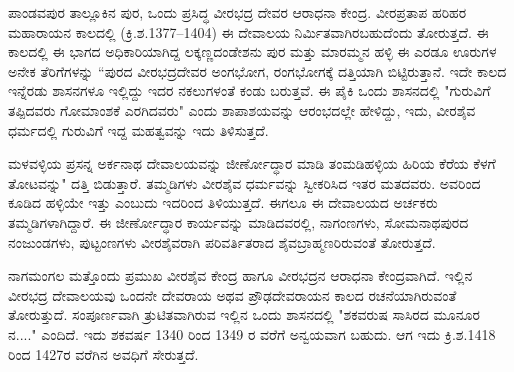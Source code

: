 ಪಾಂಡವಪುರ ತಾಲ್ಲೂಕಿನ ಪುರ, ಒಂದು ಪ್ರಸಿದ್ಧ ವೀರಭದ್ರ ದೇವರ ಆರಾಧನಾ ಕೇಂದ್ರ. ವೀರಪ್ರತಾಪ ಹರಿಹರ ಮಹಾರಾಯನ ಕಾಲದಲ್ಲಿ (ಕ್ರಿ.ಶ.1377–1404) ಈ ದೇವಾಲಯ ನಿರ್ಮಿತವಾಗಿರಬಹುದೆಂದು ತೋರುತ್ತದೆ. ಈ ಕಾಲದಲ್ಲಿ ಈ ಭಾಗದ ಅಧಿಕಾರಿಯಾಗಿದ್ದ ಲಕ್ಕಣ್ಣದಂಡೇಶನು ಪುರ ಮತ್ತು ಮಾರಮ್ಮನ ಹಳ್ಳಿ ಈ ಎರಡೂ ಊರುಗಳ ಅನೇಕ ತೆರಿಗೆಗಳನ್ನು “ಪುರದ ವೀರಭದ್ರದೇವರ ಅಂಗಭೋಗ, ರಂಗಭೋಗಕ್ಕೆ ದತ್ತಿಯಾಗಿ ಬಿಟ್ಟಿರುತ್ತಾನೆ. ಇದೇ ಕಾಲದ ಇನ್ನೆರಡು ಶಾಸನಗಳೂ ಇಲ್ಲಿದ್ದು ಇದರ ನಕಲುಗಳಂತೆ ಕಂಡು ಬರುತ್ತವೆ. ಈ ಪೈಕಿ ಒಂದು ಶಾಸನದಲ್ಲಿ "ಗುರುವಿಗೆ ತಪ್ಪಿದವರು ಗೋಮಾಂಶಕೆ ಎರಗಿದವರು" ಎಂದು ಶಾಪಾಶಯವನ್ನು ಆರಂಭದಲ್ಲೇ ಹೇಳಿದ್ದು, ಇದು, ವೀರಶೈವ ಧರ್ಮದಲ್ಲಿ ಗುರುವಿಗೆ ಇದ್ದ ಮಹತ್ವವನ್ನು ಇದು ತಿಳಿಸುತ್ತದೆ.

ಮಳವಳ್ಳಿಯ ಪ್ರಸನ್ನ ಅರ್ಕನಾಥ ದೇವಾಲಯವನ್ನು ಜೀರ್ಣೋದ್ಧಾರ ಮಾಡಿ ತಂಮಡಿಹಳ್ಳಿಯ ಹಿರಿಯ ಕೆರೆಯ ಕೆಳಗೆ ತೋಟವನ್ನು" ದತ್ತಿ ಬಿಡುತ್ತಾರೆ. ತಮ್ಮಡಿಗಳು ವೀರಶೈವ ಧರ್ಮವನ್ನು ಸ್ವೀಕರಿಸಿದ ಇತರ ಮತದವರು. ಅವರಿಂದ ಕೂಡಿದ ಹಳ್ಳಿಯೇ ಇತ್ತು ಎಂಬುದು ಇದರಿಂದ ತಿಳಿಯುತ್ತದೆ. ಈಗಲೂ ಈ ದೇವಾಲಯದ ಅರ್ಚಕರು ತಮ್ಮಡಿಗಳಾಗಿದ್ದಾರೆ. ಈ ಜೀರ್ಣೋದ್ಧಾರ ಕಾರ್ಯವನ್ನು ಮಾಡಿದವರಲ್ಲಿ, ನಾಗಂಣಗಳು, ಸೋಮನಾಥಪುರದ ನಂಜುಂಡಗಳು, ಪುಟ್ಟಂಣಗಳು ವೀರಶೈವರಾಗಿ ಪರಿವರ್ತಿತರಾದ ಶೈವಬ್ರಾಹ್ಮಣರಿರುವಂತೆ ತೋರುತ್ತದೆ.

ನಾಗಮಂಗಲ ಮತ್ತೊಂದು ಪ್ರಮುಖ ವೀರಶೈವ ಕೇಂದ್ರ ಹಾಗೂ ವೀರಭದ್ರನ ಆರಾಧನಾ ಕೇಂದ್ರವಾಗಿದೆ. ಇಲ್ಲಿನ ವೀರಭದ್ರ ದೇವಾಲಯವು ಒಂದನೇ ದೇವರಾಯ ಅಥವ ಪ್ರೌಢದೇವರಾಯನ ಕಾಲದ ರಚನೆಯಾಗಿರುವಂತೆ ತೋರುತ್ತುದೆ. ಸಂಪೂರ್ಣವಾಗಿ ತ್ರುಟಿತವಾಗಿರುವ ಇಲ್ಲಿನ ಒಂದು ಶಾಸನದಲ್ಲಿ "ಶಕವರುಷ ಸಾಸಿರದ ಮೂನೂರ ನ...." ಎಂದಿದೆ. ಇದು ಶಕವರ್ಷ 1340 ರಿಂದ 1349 ರ ವರೆಗೆ ಅನ್ವಯವಾಗ ಬಹುದು. ಆಗ ಇದು ಕ್ರಿ.ಶ.1418 ರಿಂದ 1427ರ ವರೆಗಿನ ಅವಧಿಗೆ ಸೇರುತ್ತದೆ.

